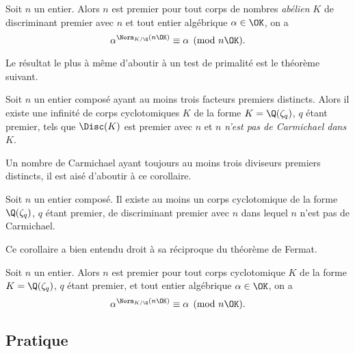 \documentclass[a4paper, 12pt, oneside]{article}
\begin{document}
\begin{theoreme}
	Soit $n$ un entier. Alors $n$ est premier \ssi pour tout corps de nombres \emph{abélien} $K$ de discriminant premier avec $n$ et tout entier algébrique $\alpha \in \OK$, on a $$\alpha^{\Norm_{K/\Q}(n\OK)} \equiv \alpha \pmod{n\OK}.$$
\end{theoreme}

Le résultat le plus à même d'aboutir à un test de primalité est le théorème suivant.

\begin{theoreme}
	Soit $n$ un entier composé ayant au moins trois facteurs premiers distincts. Alors il existe une infinité de corps cyclotomiques $K$ de la forme $K = \Q(\zeta_q)$, $q$ étant premier, tels que $\Disc(K)$ est premier avec $n$ et $n$ \emph{n'est pas de Carmichael dans $K$}.
\end{theoreme}

Un nombre de Carmichael ayant toujours au moins trois diviseurs premiers distincts, il est aisé d'aboutir à ce corollaire.

\begin{corollaire}\label{corollaire-3.7}
	Soit $n$ un entier composé. Il existe au moins un corps cyclotomique de la forme $\Q(\zeta_q)$, $q$ étant premier, de discriminant premier avec $n$ dans lequel $n$ n'est pas de Carmichael.
\end{corollaire}

Ce corollaire a bien entendu droit à sa réciproque du théorème de Fermat.

\begin{theoreme}
	Soit $n$ un entier. Alors $n$ est premier \ssi pour tout corps cyclotomique $K$ de la forme $K = \Q(\zeta_q)$, $q$ étant premier, et tout entier algébrique $\alpha\in \OK$, on a $$\alpha^{\Norm_{K/\Q}(n\OK)} \equiv \alpha \pmod{n\OK}.$$
\end{theoreme}

\subsection{Pratique}
\end{document}
